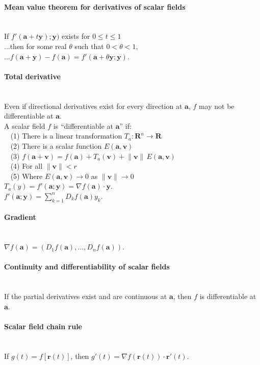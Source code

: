 \documentclass[10pt]{article}
\newcommand{\bs}[1]{\pmb{#1}}
\begin{document}
\paragraph{Mean value theorem for derivatives of scalar fields}\ \\
If $f'(\bs{a}+t\bs{y});\bs{y})$ exists for $0\leq t\leq 1$\\
...then for some real $\theta$ such that $0 < \theta < 1$,\\
...$f(\bs{a}+\bs{y})-f(\bs{a}) = f'(\bs{a}+\theta\bs{y};\bs{y})$.

\paragraph{Total derivative}\ \\
Even if directional derivatives exist for every direction at $\bs{a}$, $f$ may not be differentiable at $\bs{a}$.\\
A scalar field $f$ is ``differentiable at $\bs{a}$'' if:\\
$\phantom{x}$ (1) There is a linear transformation $T_a: \bs{R}^n \to \bs{R}$\\
$\phantom{x}$ (2) There is a scalar function $E(\bs{a},\bs{v})$\\
$\phantom{x}$ (3) $f(\bs{a}+\bs{v}) = f(\bs{a}) + T_a(\bs{v}) + \lVert\bs{v}\rVert\, E(\bs{a},\bs{v})$\\
$\phantom{x}$ (4) For all $\lVert\bs{v}\rVert < r$\\
$\phantom{x}$ (5) Where $E(\bs{a},\bs{v})\to 0$ as $\lVert\bs{v}\rVert \to 0$\\
$T_a(y) = f'(\bs{a}; \bs{y}) = \nabla f(\bs{a}) \cdot \bs{y}$.\\
$f'(\bs{a}; \bs{y}) = \sum_{k=1}^n D_k f(\bs{a}) y_k$.

\paragraph{Gradient}\ \\
$\nabla f(\bs{a}) = (D_1f(\bs{a}), \dotsc, D_nf(\bs{a}))$.

\paragraph{Continuity and differentiability of scalar fields}\ \\
If the partial derivatives exist and are continuous at $\bs{a}$, then $f$ is differentiable at $\bs{a}$.

\paragraph{Scalar field chain rule}\ \\
If $g(t) = f[\bs{r}(t)]$, then $g'(t) = \nabla f(\bs{r}(t)) \cdot \bs{r}'(t)$.
\end{document}
